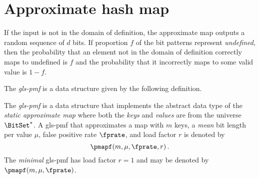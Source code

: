 \documentclass[ ../main.tex]{subfiles}
\begin{document}
\section{Approximate hash map}
If the input is not in the domain of definition, the approximate map outputs a random sequence of $d$ bits. If proportion $f$ of the bit patterns represent \emph{undefined}, then the probability that an element not in the domain of definition correctly maps to undefined is $f$ and the probability that it incorrectly maps to some valid value is $1-f$.



The \emph{\gls{gls-pmf}} is a data structure given by the following definition.
\begin{definition}
The \emph{\gls{gls-pmf}} is a data structure that implements the abstract data type of the \emph{static approximate map} where both the \emph{keys} and \emph{values} are from the universe $\BitSet^*$.
A \gls{gls-pmf} that approximates a map with $m$ keys, a \emph{mean} bit length per value $\mu$, false positive rate $\fprate$, and load factor $r$ is denoted by
\begin{equation}
    \pmapf(m, \mu, \fprate, r)\,.
\end{equation}
The \emph{minimal} \gls{gls-pmf} has load factor $r=1$ and may be denoted by $\pmapf(m,\mu,\fprate)$.
\end{definition}
\end{document}
